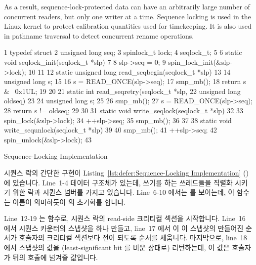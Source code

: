 As a result, sequence-lock-protected data can have an arbitrarily
large number of concurrent readers, but only one writer at a time.
Sequence locking is used in the Linux kernel to protect calibration
quantities used for timekeeping.
It is also used in pathname traversal to detect concurrent rename operations.
\fi

\begin{listing}[tb]
{ \scriptsize
\begin{verbbox}
 1  typedef struct {
 2    unsigned long seq;
 3    spinlock_t lock;
 4  } seqlock_t;
 5
 6  static void seqlock_init(seqlock_t *slp)
 7  {
 8    slp->seq = 0;
 9    spin_lock_init(&slp->lock);
10  }
11
12  static unsigned long read_seqbegin(seqlock_t *slp)
13  {
14    unsigned long s;
15
16    s = READ_ONCE(slp->seq);
17    smp_mb();
18    return s & ~0x1UL;
19  }
20
21  static int read_seqretry(seqlock_t *slp,
22                           unsigned long oldseq)
23  {
24    unsigned long s;
25
26    smp_mb();
27    s = READ_ONCE(slp->seq);
28    return s != oldseq;
29  }
30
31  static void write_seqlock(seqlock_t *slp)
32  {
33    spin_lock(&slp->lock);
34    ++slp->seq;
35    smp_mb();
36  }
37
38  static void write_sequnlock(seqlock_t *slp)
39  {
40    smp_mb();
41    ++slp->seq;
42    spin_unlock(&slp->lock);
43  }
\end{verbbox}
}
\centering
\theverbbox
\caption{Sequence-Locking Implementation}
\label{lst:defer:Sequence-Locking Implementation}
\end{listing}

시퀀스 락의 간단한 구현이
Listing~\ref{lst:defer:Sequence-Locking Implementation}
() 에 있습니다.
Line~1-4 데이터 구조체가 있는데, 쓰기를 하는 쓰레드들을 직렬화
시키기 위한 락과 시퀀스 넘버를 가지고 있습니다.
Line~6-10 에서는  를 보이는데, 이 함수는 이름이 의미하듯이
 의 초기화를 합니다.

Line~12-19 는  함수로, 시퀀스 락의 read-side 크리티컬
섹션을 시작합니다.
Line~16 에서 시퀀스 카운터의 스냅샷을 하나 만들고, line~17 에서 이 이 스냅샷의
만들어진 순서가 호출자의 크리티컬 섹션보다 전이 되도록 순서를 세웁니다.
마지막으로, line~18 에서 스냅샷의 값을 (least-significant bit 를 비운 상태로)
리턴하는데, 이 값은 호출자가 뒤의  호출에 넘겨줄 값입니다.
\iffalse

